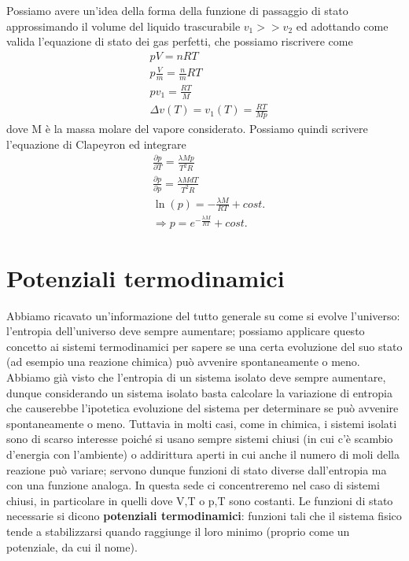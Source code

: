 \documentclass[
10pt, %
a4paper, %
oneside, %
headinclude,footinclude, %
BCOR5mm, %
]{scrartcl}
\begin{document}
\begin{exercise}
	Possiamo avere un'idea della forma della funzione di passaggio di stato approssimando il volume del liquido trascurabile \(v_1>>v_2\) ed adottando come valida l'equazione di stato dei gas perfetti, che possiamo riscrivere come
	\begin{align*}
		&pV = nRT\\
		&p\frac{V}{m} = \frac{n}{m}RT\\
		&pv_1=\frac{RT}{M}\\
		&\Delta v(T) = v_1(T) = \frac{RT}{Mp}
	\end{align*}
	dove M è la massa molare del vapore considerato. Possiamo quindi scrivere l'equazione di Clapeyron ed integrare
	\begin{align*}
		&\frac{\partial p}{\partial T} = \frac{\lambda M p}{T^2 R}\\
		&\frac{\partial p}{\partial p} = \frac{\lambda M dT}{T^2 R}\\
		&\ln(p) = -\frac{\lambda M}{ RT}+cost.\\
		&\Rightarrow p =e^{-\frac{\lambda M}{ RT}}+cost.
	\end{align*}
\end{exercise}
\newpage
\section{Potenziali termodinamici}
Abbiamo ricavato un'informazione del tutto generale su come si evolve l'universo: l'entropia dell'universo deve sempre aumentare; possiamo applicare questo concetto ai sistemi termodinamici per sapere se una certa evoluzione del suo stato (ad esempio una reazione chimica) può avvenire spontaneamente o meno. Abbiamo già visto che l'entropia di un sistema isolato deve sempre aumentare, dunque considerando un sistema isolato basta calcolare la variazione di entropia che causerebbe l'ipotetica evoluzione del sistema per determinare se può avvenire spontaneamente o meno. Tuttavia in molti casi, come in chimica, i sistemi isolati sono di scarso interesse poiché si usano sempre sistemi chiusi (in cui c'è scambio d'energia con l'ambiente) o addirittura aperti in cui anche il numero di moli della reazione può variare; servono dunque funzioni di stato diverse dall'entropia ma con una funzione analoga. In questa sede ci concentreremo nel caso di sistemi chiusi, in particolare in quelli dove V,T o p,T sono costanti. Le funzioni di stato necessarie si dicono \textbf{potenziali termodinamici}: funzioni tali che il sistema fisico tende a stabilizzarsi quando raggiunge il loro minimo (proprio come un potenziale, da cui il nome). 
\end{document}

